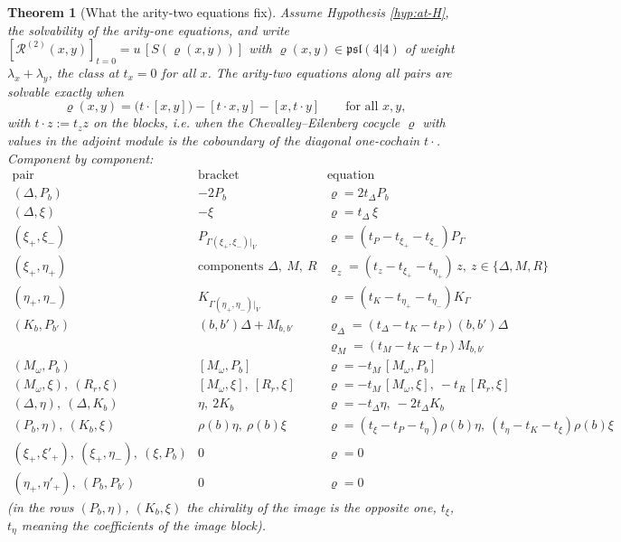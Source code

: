 \documentclass[11pt]{article}
\numberwithin{equation}{section}
\theoremstyle{plain}
\newtheorem{theorem}{Theorem}[section]
\theoremstyle{definition}
\begin{document}
\begin{theorem}[What the arity-two equations fix]
\label{thm:at-fix}
Assume Hypothesis \ref{hyp:at-H}, the solvability of the arity-one equations, and write $[\mathcal R^{(2)}(x,y)]_{t=0}=u\,[S(\varrho(x,y))]$ with $\varrho(x,y)\in\mathfrak{psl}(4|4)$ of weight $\lambda_x+\lambda_y$, the class at $t_x=0$ for all $x$. The arity-two equations along all pairs are solvable exactly when
\begin{equation}
\varrho(x,y)=\big(t\cdot[x,y]\big)-[t\cdot x,y]-[x,t\cdot y]\qquad\text{for all }x,y,
\label{eq:at-rho}
\end{equation}
with $t\cdot z:=t_zz$ on the blocks, i.e. when the Chevalley--Eilenberg cocycle $\varrho$ with values in the adjoint module is the coboundary of the diagonal one-cochain $t\cdot$. Component by component:
\[
\begin{array}{l|l|l}
\text{pair} & \text{bracket} & \text{equation}\\
\hline
(\Delta,P_b) & -2P_b & \varrho=2t_\Delta P_b\\
(\Delta,\xi) & -\xi & \varrho=t_\Delta\,\xi\\
(\xi_+,\xi_-) & P_{\Gamma(\xi_+,\xi_-)|_V} & \varrho=(t_P-t_{\xi_+}-t_{\xi_-})P_{\Gamma}\\
(\xi_+,\eta_+) & \text{components }\Delta,\ M,\ R & \varrho_z=(t_z-t_{\xi_+}-t_{\eta_+})\,z,\ z\in\{\Delta,M,R\}\\
(\eta_+,\eta_-) & K_{\Gamma(\eta_+,\eta_-)|_V} & \varrho=(t_K-t_{\eta_+}-t_{\eta_-})K_{\Gamma}\\
(K_b,P_{b'}) & (b,b')\Delta+M_{b,b'} & \varrho_\Delta=(t_\Delta-t_K-t_P)(b,b')\Delta\\
 & & \varrho_M=(t_M-t_K-t_P)M_{b,b'}\\
(M_\omega,P_b) & [M_\omega,P_b] & \varrho=-t_M\,[M_\omega,P_b]\\
(M_\omega,\xi),\ (R_r,\xi) & [M_\omega,\xi],\ [R_r,\xi] & \varrho=-t_M\,[M_\omega,\xi],\ -t_R\,[R_r,\xi]\\
(\Delta,\eta),\ (\Delta,K_b) & \eta,\ 2K_b & \varrho=-t_\Delta\eta,\ -2t_\Delta K_b\\
(P_b,\eta),\ (K_b,\xi) & \rho(b)\eta,\ \rho(b)\xi & \varrho=(t_{\xi}-t_P-t_{\eta})\rho(b)\eta,\ (t_\eta-t_K-t_\xi)\rho(b)\xi\\
(\xi_+,\xi'_+),\ (\xi_+,\eta_-),\ (\xi,P_b) & 0 & \varrho=0\\
(\eta_+,\eta'_+),\ (P_b,P_{b'}) & 0 & \varrho=0
\end{array}
\]
(in the rows $(P_b,\eta)$, $(K_b,\xi)$ the chirality of the image is the opposite one, $t_\xi$, $t_\eta$ meaning the coefficients of the image block).

\end{theorem}
\end{document}
